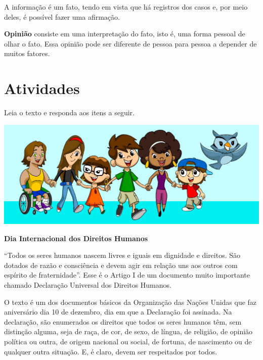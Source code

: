 \begin{conteudo}
\begin{conteudo}
\begin{conteudo}
\begin{conteudo}
\begin{conteudo}
{%

A informação é um fato, tendo em vista que há registros dos casos e, por
meio deles, é possível fazer uma afirmação.

\textbf{Opinião} consiste em uma interpretação do fato, isto é, uma
forma pessoal de olhar o fato. Essa opinião pode ser diferente de pessoa
para pessoa a depender de muitos fatores. 

}

\section*{Atividades}

Leia o texto e responda aos itens a seguir.


\begin{myquote}
\begin{center}
\includegraphics[width=\textwidth]{media/image28.jpeg}
\end{center}

\textbf{Dia Internacional dos Direitos Humanos}

``Todos os seres humanos nascem livres e iguais em dignidade e
direitos. São dotados de razão e consciência e devem agir em relação
uns aos outros com espírito de fraternidade''. Esse é o Artigo I de um
documento muito importante chamado Declaração Universal dos Direitos
Humanos.

O texto é um dos documentos básicos da Organização das Nações Unidas que
faz aniversário dia 10 de dezembro, dia em que a Declaração foi
assinada. Na declaração, são enumerados os direitos que todos os seres
humanos têm, sem distinção alguma, seja de raça, de cor, de sexo, de
língua, de religião, de opinião política ou outra, de origem nacional ou
social, de fortuna, de nascimento ou de qualquer outra situação. E, é
claro, devem ser respeitados por todos.


\end{myquote}
\end{conteudo}
\end{conteudo}
\end{conteudo}
\end{conteudo}
\end{conteudo}
